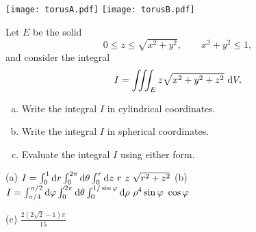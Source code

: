 \begin{solution}
\begin{center}
     \texttt{[image: torusA.pdf]}\qquad
     \texttt{[image: torusB.pdf]}
\end{center}
\end{solution}

\begin{question}[M200 2014A] %
Let $E$ be the solid
\begin{equation*}
0 \le z \le \sqrt{x^2 + y^2},\qquad
x^2 + y^2 \le 1,
\end{equation*}
and consider the integral
\begin{equation*}
I = \iiint_E z \sqrt{x^2 + y^2 + z^2}\  \mathrm{d}V.
\end{equation*}
\begin{enumerate}[(a)]
\item
Write the integral $I$ in cylindrical coordinates.

\item
Write the integral $I$ in spherical coordinates.

\item
Evaluate the integral $I$ using either form.
\end{enumerate}
\end{question}

%

\begin{answer}
(a) $I = \int_0^1\dee{r} \int_0^{2\pi}\dee{\theta} \int_0^r\dee{z}\ 
           r\ z\ \sqrt{r^2+z^2}$\qquad
(b) $I = \int_{\pi/4}^{\pi/2}\dee{\varphi} 
                \int_0^{2\pi}\dee{\theta} 
                \int_0^{1/\sin\varphi}\dee{\rho}\ 
                \rho^4\sin\varphi \ \cos\varphi$ 

(c) $\frac{2(2\sqrt{2}-1)\pi}{15}$
\end{answer}

